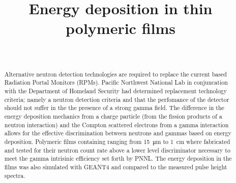 \documentclass[draftcls,onecolumn]{IEEEtran}
\begin{document}
\title{Energy deposition in thin polymeric films}
\author{
    \\
}

\maketitle

\begin{abstract}

Alternative neutron detection technologies are required to replace the current  based Radiation Portal Monitors (RPMs).
Pacific Northwest National Lab in conjuncation with the Department of Homeland Security had determined replacement technology criteria; namely a neutron detection criteria and that the perfomance of the detector should not suffer in the the presence of a strong gamma field.
The difference in the energy deposition mechanics from a charge particle (from the fission products of a neutron interaction) and the Compton scattered electrons from a gamma interaction allows for the effective discrimination between neutrons and gammas based on energy deposition.
Polymeric films containing  ranging from \SI{15}{\um} to \SI{1}{\cm} where fabricated and tested for their neutron count rate above a lower level discriminator necessary to meet the gamma intrisinic efficiency set forth by PNNL.
The energy deposition in the films was also simulated with GEANT4 and compared to the measured pulse height spectra.
\end{abstract}

\IEEEpeerreviewmaketitle

\end{document}
